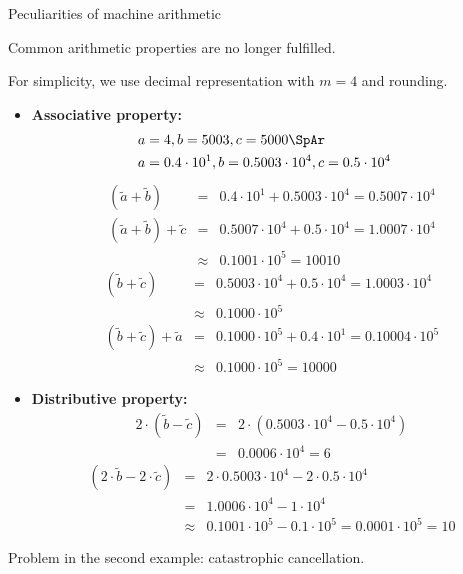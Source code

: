 








\begin{vbframe}{Peculiarities of machine arithmetic}

Common arithmetic properties are no longer fulfilled.

\vspace*{0.1cm}

For simplicity, we use decimal representation with $m = 4$ and rounding.

\begin{itemize}
\item \textbf{Associative property:}
 \begin{eqnarray*}
 &a = 4, b = 5003, c = 5000 \SpAr& \\
 &a = 0.4 \cdot 10^1, b = 0.5003 \cdot 10^4, c = 0.5 \cdot 10^4&
 \end{eqnarray*}
 \begin{eqnarray*}
 (\tilde a + \tilde b) &=& 0.4 \cdot 10^1 + 0.5003 \cdot 10^4 = 0.5007 \cdot 10^4 \\
 (\tilde a + \tilde b) + \tilde c &=& 0.5007 \cdot 10^4 + 0.5 \cdot 10^4 = 1.0007 \cdot 10^4 \\
 &\approx& 0.1001 \cdot 10^5 = 10010
 \end{eqnarray*}
 \begin{eqnarray*}
 (\tilde b + \tilde c) &=& 0.5003 \cdot 10^4 + 0.5 \cdot 10^4 = 1.0003 \cdot 10^4 \\
 &\approx& 0.1000 \cdot 10^5 \\
 (\tilde b + \tilde c) + \tilde a &=& 0.1000 \cdot 10^5 + 0.4 \cdot 10^1 = 0.10004 \cdot 10^5 \\
 &\approx& 0.1000 \cdot 10^5 = 10000
 \end{eqnarray*}

 \framebreak

\item \textbf{Distributive property:}
 \begin{eqnarray*}
 2 \cdot (\tilde b - \tilde c) &=& 2 \cdot (0.5003 \cdot 10^4 - 0.5 \cdot 10^4) \\
 &=& 0.0006 \cdot 10^4 = 6
 \end{eqnarray*}
 \begin{eqnarray*}
 (2 \cdot \tilde b - 2 \cdot \tilde c) &=& 2 \cdot 0.5003 \cdot 10^4 - 2 \cdot 0.5 \cdot 10^4 \\
 &=& 1.0006 \cdot 10^4 - 1 \cdot 10^4 \\
 &\approx& 0.1001 \cdot 10^5 - 0.1 \cdot 10^5 = 0.0001 \cdot 10^5 = 10
 \end{eqnarray*}
\end{itemize}
Problem in the second example: catastrophic cancellation.
\end{vbframe}



